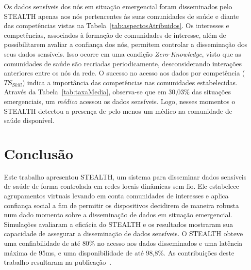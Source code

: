 \documentclass[12pt]{article}
\newcommand{\al}[1]{\textcolor{brown}{{\bf #1}}}
\begin{document}
Os dados sensíveis dos nós em situação emergencial foram disseminados pelo \mbox{STEALTH} apenas aos nós pertencentes às suas comunidades de saúde e diante das competências vistas na Tabela~\ref{tab:aspectosAtribuidos}.
Os
interesses e competências, associados à formação de comunidades de interesse, além de possibilitarem avaliar a confiança dos nós, permitem controlar a disseminação dos seus dados sensíveis. Isso ocorre em uma condição \textit{Zero-Knowledge}, visto que as comunidades de saúde são recriadas periodicamente, desconsiderando interações anteriores entre os nós da rede. O sucesso no acesso aos dados por competência ($TS_{Skill}$) indica a
importância
das competências nas comunidades estabelecidas. 
Através da Tabela~\ref{tab:taxaMedia}, observa-se
que em 30,03\% das situações emergenciais,
um \textit{médico} acessou os dados sensíveis. Logo, nesses momentos
o \mbox{STEALTH} detectou a presença de pelo menos um médico na comunidade de saúde disponível.

\vspace{-0.2cm}




\section{Conclusão}
\label{sec:conc}

Este trabalho apresentou \mbox{STEALTH}, um sistema para disseminar dados sensíveis de saúde de forma controlada em redes locais dinâmicas sem fio. Ele estabelece agrupamentos virtuais levando em conta comunidades de interesses e aplica confiança social a fim de permitir os dispositivos decidirem de maneira robusta num dado momento sobre a disseminação de dados em situação emergencial. Simulações avaliaram a eficácia do \mbox{STEALTH} e os resultados mostraram sua capacidade de assegurar a disseminação de dados sensíveis. O \mbox{STEALTH} obteve uma confiabilidade de até 80\% no acesso aos dados disseminados e uma latência máxima de 95ms, e uma disponibilidade de até 98,8\%. As contribuições deste trabalho resultaram na publicação~\cite{batista2019sbseg}.

\small


\end{document}
